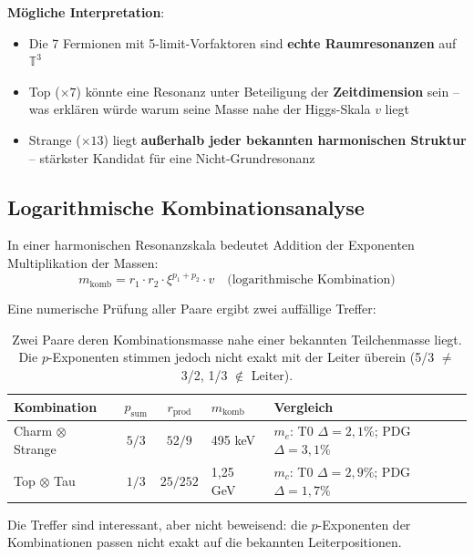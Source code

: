\textbf{Mögliche Interpretation}:
\begin{itemize}
    \item Die 7 Fermionen mit 5-limit-Vorfaktoren sind
          \textbf{echte Raumresonanzen} auf $\mathbb{T}^3$
    \item Top ($\times 7$) könnte eine Resonanz unter Beteiligung
          der \textbf{Zeitdimension} sein -- was erklären würde
          warum seine Masse nahe der Higgs-Skala $v$ liegt
    \item Strange ($\times 13$) liegt \textbf{außerhalb jeder
          bekannten harmonischen Struktur} -- stärkster Kandidat
          für eine Nicht-Grundresonanz
\end{itemize}

\subsection{Logarithmische Kombinationsanalyse}

In einer harmonischen Resonanzskala bedeutet Addition der Exponenten
Multiplikation der Massen:
\begin{equation}
    m_{\text{komb}} = r_1 \cdot r_2 \cdot \xi^{p_1+p_2} \cdot v
    \quad \text{(logarithmische Kombination)}
\end{equation}

Eine numerische Prüfung aller Paare ergibt zwei auffällige Treffer:

\begin{table}[htbp]
\centering\footnotesize
\begin{tabular}{lccll}
\toprule
\textbf{Kombination} & $p_{\text{sum}}$ & $r_{\text{prod}}$ & $m_{\text{komb}}$ & \textbf{Vergleich} \\
\midrule
Charm $\otimes$ Strange & $5/3$ & $52/9$ & 495 keV & $m_e$: T0 $\Delta{=}2{,}1\%$; PDG $\Delta{=}3{,}1\%$ \\
Top $\otimes$ Tau       & $1/3$ & $25/252$ & 1{,}25 GeV & $m_c$: T0 $\Delta{=}2{,}9\%$; PDG $\Delta{=}1{,}7\%$ \\
\bottomrule
\end{tabular}
\caption{Zwei Paare deren Kombinationsmasse nahe einer bekannten
Teilchenmasse liegt. Die $p$-Exponenten stimmen jedoch nicht exakt
mit der Leiter überein (5/3 $\neq$ 3/2, 1/3 $\notin$ Leiter).}
\label{tab:kombination}
\end{table}

Die Treffer sind interessant, aber nicht beweisend: die
$p$-Exponenten der Kombinationen passen nicht exakt auf die
bekannten Leiterpositionen.

